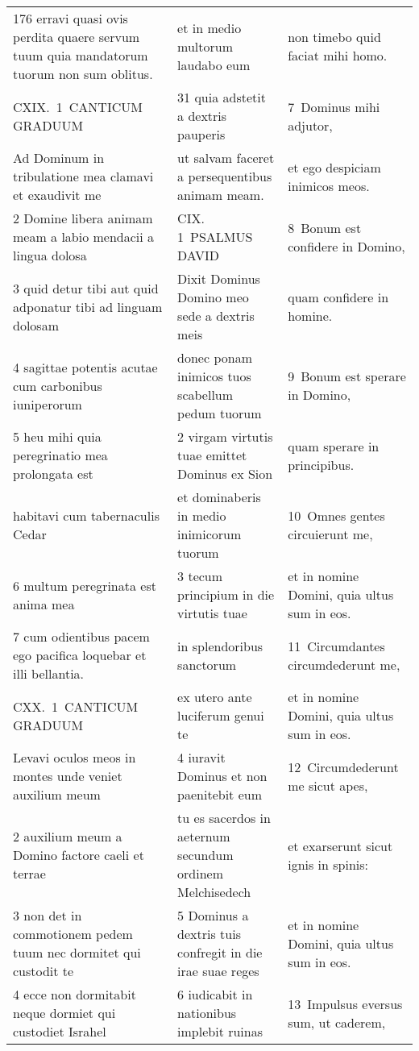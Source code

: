 \documentclass{article}
\begin{document}
\begin{longtable}{@{}p{}p{}p{}@{}}
176 erravi quasi ovis perdita quaere servum tuum quia mandatorum tuorum non sum oblitus.	&	et in medio multorum laudabo eum	&	non timebo quid faciat mihi homo.	\\
CXIX. 1 CANTICUM GRADUUM	&	31 quia adstetit a dextris pauperis	&	7 Dominus mihi adjutor,	\\
Ad Dominum in tribulatione mea clamavi et exaudivit me	&	ut salvam faceret a persequentibus animam meam.	&	et ego despiciam inimicos meos.	\\
2 Domine libera animam meam a labio mendacii a lingua dolosa	&	CIX. 1 PSALMUS DAVID	&	8 Bonum est confidere in Domino,	\\
3 quid detur tibi aut quid adponatur tibi ad linguam dolosam	&	Dixit Dominus Domino meo sede a dextris meis	&	quam confidere in homine.	\\
4 sagittae potentis acutae cum carbonibus iuniperorum	&	donec ponam inimicos tuos scabellum pedum tuorum	&	9 Bonum est sperare in Domino,	\\
5 heu mihi quia peregrinatio mea prolongata est	&	2 virgam virtutis tuae emittet Dominus ex Sion	&	quam sperare in principibus.	\\
habitavi cum tabernaculis Cedar	&	et dominaberis in medio inimicorum tuorum	&	10 Omnes gentes circuierunt me,	\\
6 multum peregrinata est anima mea	&	3 tecum principium in die virtutis tuae	&	et in nomine Domini, quia ultus sum in eos.	\\
7 cum odientibus pacem ego pacifica loquebar et illi bellantia.	&	in splendoribus sanctorum	&	11 Circumdantes circumdederunt me,	\\
CXX. 1 CANTICUM GRADUUM	&	ex utero ante luciferum genui te	&	et in nomine Domini, quia ultus sum in eos.	\\
Levavi oculos meos in montes unde veniet auxilium meum	&	4 iuravit Dominus et non paenitebit eum	&	12 Circumdederunt me sicut apes,	\\
2 auxilium meum a Domino factore caeli et terrae	&	tu es sacerdos in aeternum secundum ordinem Melchisedech	&	et exarserunt sicut ignis in spinis:	\\
3 non det in commotionem pedem tuum nec dormitet qui custodit te	&	5 Dominus a dextris tuis confregit in die irae suae reges	&	et in nomine Domini, quia ultus sum in eos.	\\
4 ecce non dormitabit neque dormiet qui custodiet Israhel	&	6 iudicabit in nationibus implebit ruinas	&	13 Impulsus eversus sum, ut caderem,	\\

\end{longtable}
\end{document}
